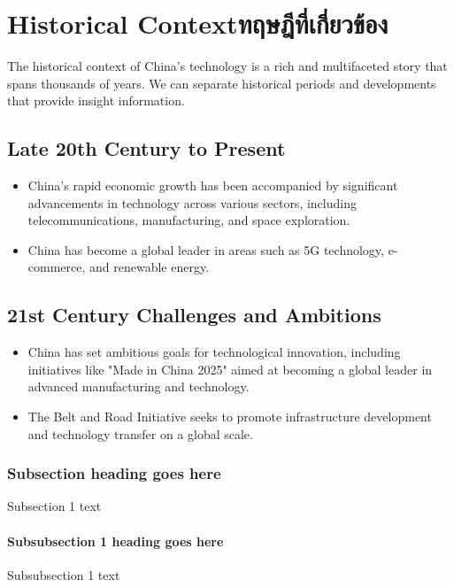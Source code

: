 \chapter{\ifenglish Historical Context\else ทฤษฎีที่เกี่ยวข้อง\fi}

The historical context of China's technology is a rich and multifaceted story 
that spans thousands of years. We can separate historical periods and 
developments that provide insight information.

\section{Late 20th Century to Present}

\begin{itemize}
  \item China's rapid economic growth has been accompanied by significant 
  advancements in technology across various sectors, including 
  telecommunications, manufacturing, and space exploration.
  \item China has become a global leader in areas such as 5G technology, 
  e-commerce, and renewable energy.
\end{itemize}

\section{21st Century Challenges and Ambitions}

\begin{itemize}
  \item China has set ambitious goals for technological innovation, including 
  initiatives like "Made in China 2025" aimed at becoming a global leader in 
  advanced manufacturing and technology.
  \item The Belt and Road Initiative seeks to promote infrastructure 
  development and technology transfer on a global scale.
\end{itemize}

\subsection{Subsection heading goes here}

Subsection 1 text

\subsubsection{Subsubsection 1 heading goes here}
Subsubsection 1 text

